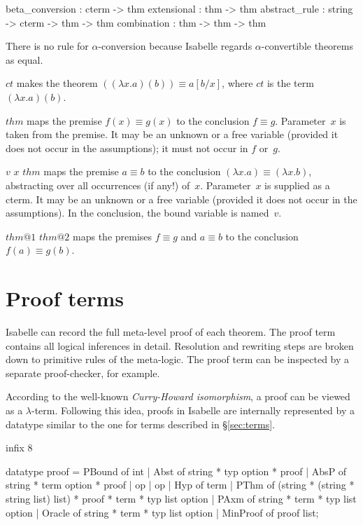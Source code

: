 \begin{ttbox} 
beta_conversion : cterm -> thm
extensional     : thm -> thm
abstract_rule   : string -> cterm -> thm -> thm
combination     : thm -> thm -> thm
\end{ttbox} 
There is no rule for $\alpha$-conversion because Isabelle regards
$\alpha$-convertible theorems as equal.
\begin{ttdescription}
\item[\ttindexbold{beta_conversion} $ct$] 
makes the theorem $((\lambda x.a)(b)) \equiv a[b/x]$, where $ct$ is the
term $(\lambda x.a)(b)$.

\item[\ttindexbold{extensional} $thm$] 
maps the premise $f(x) \equiv g(x)$ to the conclusion $f\equiv g$.
Parameter~$x$ is taken from the premise.  It may be an unknown or a free
variable (provided it does not occur in the assumptions); it must not occur
in $f$ or~$g$.

\item[\ttindexbold{abstract_rule} $v$ $x$ $thm$] 
maps the premise $a\equiv b$ to the conclusion $(\lambda x.a) \equiv
(\lambda x.b)$, abstracting over all occurrences (if any!) of~$x$.
Parameter~$x$ is supplied as a cterm.  It may be an unknown or a free
variable (provided it does not occur in the assumptions).  In the
conclusion, the bound variable is named~$v$.

\item[\ttindexbold{combination} $thm@1$ $thm@2$] 
maps the premises $f\equiv g$ and $a\equiv b$ to the conclusion~$f(a)\equiv
g(b)$.
\end{ttdescription}


\section{Proof terms}\label{sec:proofObjects}
 Isabelle can record the full meta-level proof of each
theorem.  The proof term contains all logical inferences in detail.
Resolution and rewriting steps are broken down to primitive rules of the
meta-logic. The proof term can be inspected by a separate proof-checker,
for example.

According to the well-known {\em Curry-Howard isomorphism}, a proof can
be viewed as a $\lambda$-term. Following this idea, proofs
in Isabelle are internally represented by a datatype similar to the one for
terms described in \S\ref{sec:terms}.
\begin{ttbox}
infix 8 %

datatype proof =
   PBound of int
 | Abst of string * typ option * proof
 | AbsP of string * term option * proof
 | op %
 | op %
 | Hyp of term
 | PThm of (string * (string * string list) list) *
           proof * term * typ list option
 | PAxm of string * term * typ list option
 | Oracle of string * term * typ list option
 | MinProof of proof list;
\end{ttbox}


